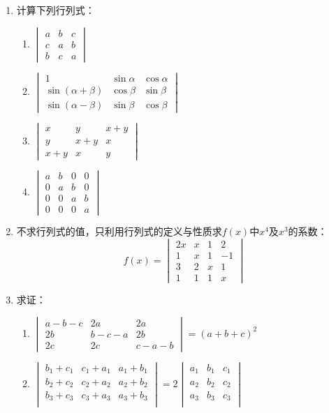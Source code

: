 \begin{enumerate}
\item 计算下列行列式：
\begin{multicols}{2}
\begin{enumerate}
    \item $\begin{vmatrix}
        a&b&c\\c&a&b\\b&c&a
    \end{vmatrix}$
    \item $\begin{vmatrix}
        1&\sin\alpha&\cos\alpha\\\sin(\alpha+\beta)&\cos\beta&\sin\beta\\
        \sin(\alpha-\beta)&\sin\beta&\cos\beta
    \end{vmatrix}$
    \item $\begin{vmatrix}
x&y&x+y\\y&x+y&x\\x+y&x&y        
    \end{vmatrix}$
    \item $\begin{vmatrix}
        a&b&0&0\\0&a&b&0\\0&0&a&b\\0&0&0&a
    \end{vmatrix}$
\end{enumerate}
\end{multicols}

\item 不求行列式的值，只利用行列式的定义与性质求$f(x)$中$x^4$及$x^3$的系数：
\[f(x)=\begin{vmatrix}
    2x&x&1&2\\1&x&1&-1\\3&2&x&1\\1&1&1&x
\end{vmatrix}\]

\item 求证：
\begin{enumerate}
    \item $\begin{vmatrix}
        a-b-c&2a&2a\\2b&b-c-a&2b\\2c&2c&c-a-b
    \end{vmatrix}=(a+b+c)^2$
    \item $\begin{vmatrix}
        b_1+c_1&c_1+a_1&a_1+b_1\\
        b_2+c_2&c_2+a_2&a_2+b_2\\
        b_3+c_3&c_3+a_3&a_3+b_3\\
    \end{vmatrix}=2\begin{vmatrix}
        a_1&b_1&c_1\\a_2&b_2&c_2\\a_3&b_3&c_3\\
    \end{vmatrix}$
\end{enumerate}


\end{enumerate}
